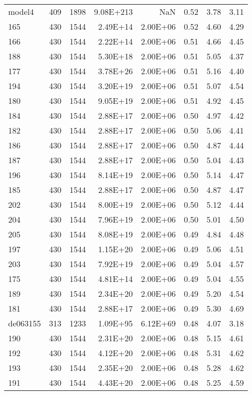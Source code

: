 \documentclass[10pt]{article}
\begin{document}
\begin{longtable}{|l|r|r|r|r|r|r|r|}
model4	&	409	&	1898	&	9.08E+213	&	NaN	&	0.52	&	3.78	&	3.11	\\
165	&	430	&	1544	&	2.49E+14	&	2.00E+06	&	0.52	&	4.60	&	4.29	\\
166	&	430	&	1544	&	2.22E+14	&	2.00E+06	&	0.51	&	4.66	&	4.45	\\
188	&	430	&	1544	&	5.30E+18	&	2.00E+06	&	0.51	&	5.05	&	4.37	\\
177	&	430	&	1544	&	3.78E+26	&	2.00E+06	&	0.51	&	5.16	&	4.40	\\
194	&	430	&	1544	&	3.20E+19	&	2.00E+06	&	0.51	&	5.07	&	4.54	\\
180	&	430	&	1544	&	9.05E+19	&	2.00E+06	&	0.51	&	4.92	&	4.45	\\
184	&	430	&	1544	&	2.88E+17	&	2.00E+06	&	0.50	&	4.97	&	4.42	\\
182	&	430	&	1544	&	2.88E+17	&	2.00E+06	&	0.50	&	5.06	&	4.41	\\
186	&	430	&	1544	&	2.88E+17	&	2.00E+06	&	0.50	&	4.87	&	4.44	\\
187	&	430	&	1544	&	2.88E+17	&	2.00E+06	&	0.50	&	5.04	&	4.43	\\
196	&	430	&	1544	&	8.14E+19	&	2.00E+06	&	0.50	&	5.14	&	4.47	\\
185	&	430	&	1544	&	2.88E+17	&	2.00E+06	&	0.50	&	4.87	&	4.47	\\
202	&	430	&	1544	&	8.00E+19	&	2.00E+06	&	0.50	&	5.12	&	4.44	\\
204	&	430	&	1544	&	7.96E+19	&	2.00E+06	&	0.50	&	5.01	&	4.50	\\
205	&	430	&	1544	&	8.08E+19	&	2.00E+06	&	0.49	&	4.84	&	4.48	\\
197	&	430	&	1544	&	1.15E+20	&	2.00E+06	&	0.49	&	5.06	&	4.51	\\
203	&	430	&	1544	&	7.92E+19	&	2.00E+06	&	0.49	&	5.04	&	4.57	\\
175	&	430	&	1544	&	4.81E+14	&	2.00E+06	&	0.49	&	5.04	&	4.55	\\
189	&	430	&	1544	&	2.34E+20	&	2.00E+06	&	0.49	&	5.20	&	4.54	\\
181	&	430	&	1544	&	2.88E+17	&	2.00E+06	&	0.49	&	5.30	&	4.69	\\
de063155	&	313	&	1233	&	1.09E+95	&	6.12E+69	&	0.48	&	4.07	&	3.18	\\
190	&	430	&	1544	&	2.31E+20	&	2.00E+06	&	0.48	&	5.15	&	4.61	\\
192	&	430	&	1544	&	4.12E+20	&	2.00E+06	&	0.48	&	5.31	&	4.62	\\
193	&	430	&	1544	&	2.35E+20	&	2.00E+06	&	0.48	&	5.28	&	4.62	\\
191	&	430	&	1544	&	4.43E+20	&	2.00E+06	&	0.48	&	5.25	&	4.59	\\

\end{longtable}
\end{document}
